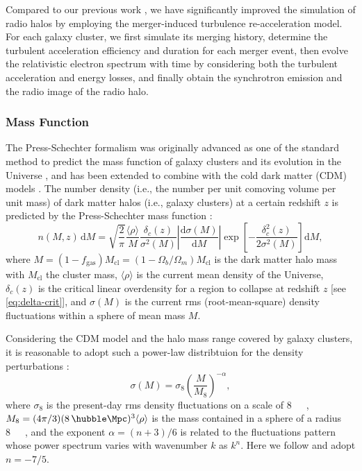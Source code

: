 \documentclass[modern]{aastex62}
\newcommand{\R}[1]{\mathrm{#1}}
\newcommand{\D}[1]{\R{d} #1}
\newcommand{\diff}[2]{\frac{\D{#1}}{\D{#2}}}
\begin{document}
Compared to our previous work \citep{wang2010},
we have significantly improved the simulation of radio halos by
employing the merger-induced turbulence re-acceleration model.
For each galaxy cluster, we first simulate its merging history,
determine the turbulent acceleration efficiency and duration for each
merger event, then evolve the relativistic electron spectrum with time
by considering both the turbulent acceleration and energy losses, and
finally obtain the synchrotron emission and the radio image of the
radio halo.

\subsubsection{Mass Function}
\label{sec:distributions}

The Press-Schechter formalism was originally advanced as one of the standard
method to predict the mass function of galaxy clusters and its evolution
in the Universe \citep{press1974}, and has been extended to combine with
the cold dark matter (CDM) models \citep[e.g.,][]{bond1991,lacey1993}.
The number density (i.e., the number per unit comoving volume per unit
mass) of dark matter halos (i.e., galaxy clusters) at a certain redshift
$z$ is predicted by the Press-Schechter mass function \citep{press1974}:
\begin{equation}
  \label{eq:ps-mass-func}
  n(M, z) \,\D{M} = \sqrt{\frac{2}{\pi}} \frac{\langle{\rho}\rangle}{M}
  \frac{\delta_c(z)}{\sigma^2(M)} \left| \diff{\sigma(M)}{M} \right|
  \exp\!\left[ -\frac{\delta_c^2(z)}{2\sigma^2(M)} \right] \D{M},
\end{equation}
where
$M = (1 - f_{\R{gas}}) M_{\R{cl}} = (1 - \Omega_b/\Omega_m) M_{\R{cl}}$
is the dark matter halo mass with $M_{\R{cl}}$ the cluster mass,
$\langle {\rho} \rangle$ is the current mean density of the Universe,
$\delta_c(z)$ is the critical linear overdensity for a region to collapse
at redshift $z$ [see \autoref{eq:delta-crit}],
and $\sigma(M)$ is the current rms (root-mean-square) density fluctuations
within a sphere of mean mass $M$.

Considering the CDM model and the halo mass range covered by galaxy
clusters, it is reasonable to adopt such a power-law distribtuion
for the density perturbations \citep{sarazin2002,randall2002}:
\begin{equation}
  \label{eq:sigma-mass}
  \sigma(M) = \sigma_8 \left( \frac{M}{M_8} \right)^{-\alpha},
\end{equation}
where $\sigma_8$ is the present-day rms density fluctuations on a
scale of \SI{8}{\per\hubble\Mpc},
$M_8 = (4\pi/3)(8 \,\si{\per\hubble\Mpc})^3 \langle{\rho}\rangle$
is the mass contained in a sphere of a radius \SI{8}{\per\hubble\Mpc},
and the exponent $\alpha = (n+3)/6$ is related to the fluctuations
pattern whose power spectrum varies with wavenumber $k$ as $k^n$.
Here we follow \citet{randall2002} and adopt $n = -7/5$.
\end{document}
